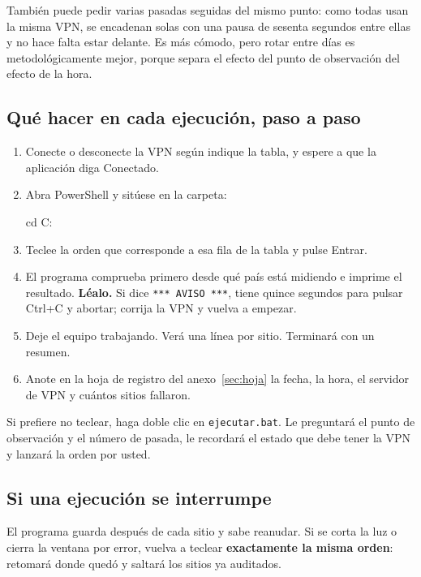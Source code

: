 \documentclass[11pt,a4paper]{article}
\begin{document}
También puede pedir varias pasadas seguidas del mismo punto: como todas usan la misma VPN, se encadenan solas con una pausa de sesenta segundos entre ellas y no hace falta estar delante. Es más cómodo, pero rotar entre días es metodológicamente mejor, porque separa el efecto del punto de observación del efecto de la hora.

\subsection{Qué hacer en cada ejecución, paso a paso}

\begin{enumerate}
	\item Conecte o desconecte la VPN según indique la tabla, y espere a que la aplicación diga \textsf{Conectado}.
	\item Abra PowerShell y sitúese en la carpeta:
	\begin{orden}
cd C:\auditoria
	\end{orden}
	\item Teclee la orden que corresponde a esa fila de la tabla y pulse \textsf{Entrar}.
	\item El programa comprueba primero desde qué país está midiendo e imprime el resultado. \textbf{Léalo.} Si dice \texttt{*** AVISO ***}, tiene quince segundos para pulsar \textsf{Ctrl+C} y abortar; corrija la VPN y vuelva a empezar.
	\item Deje el equipo trabajando. Verá una línea por sitio. Terminará con un resumen.
	\item Anote en la hoja de registro del anexo~\ref{sec:hoja} la fecha, la hora, el servidor de VPN y cuántos sitios fallaron.
\end{enumerate}

\begin{nota}
	Si prefiere no teclear, haga doble clic en \texttt{ejecutar.bat}. Le preguntará el punto de observación y el número de pasada, le recordará el estado que debe tener la VPN y lanzará la orden por usted.
\end{nota}

\subsection{Si una ejecución se interrumpe}

El programa guarda después de cada sitio y sabe reanudar. Si se corta la luz o cierra la ventana por error, vuelva a teclear \textbf{exactamente la misma orden}: retomará donde quedó y saltará los sitios ya auditados.
\end{document}
